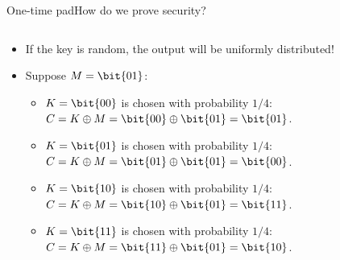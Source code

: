 \documentclass[aspectratio=169, lualatex, handout]{beamer}
\begin{document}
\begin{frame}{One-time pad}{How do we prove security?}
	\begin{columns}[c]
		\begin{column}{0.7\textwidth}
			\begin{itemize}[<+->]
				\item If the key is random, the output will be uniformly distributed!
				\item Suppose $M = \bit{01}$:
				      \begin{itemize}[<+->]
					      \item $K = \bit{00}$ is chosen with probability $1/4$:\\$C = K \oplus M = \bit{00} \oplus \bit{01} = \bit{01}$.
					      \item $K = \bit{01}$ is chosen with probability $1/4$:\\$C = K \oplus M = \bit{01} \oplus \bit{01} = \bit{00}$.
					      \item $K = \bit{10}$ is chosen with probability $1/4$:\\$C = K \oplus M = \bit{10} \oplus \bit{01} = \bit{11}$.
					      \item $K = \bit{11}$ is chosen with probability $1/4$:\\$C = K \oplus M = \bit{11} \oplus \bit{01} = \bit{10}$.
				      \end{itemize}
			\end{itemize}
		\end{column}
		\begin{column}{0.3\textwidth}
		\end{column}
	\end{columns}
\end{frame}
\end{document}
